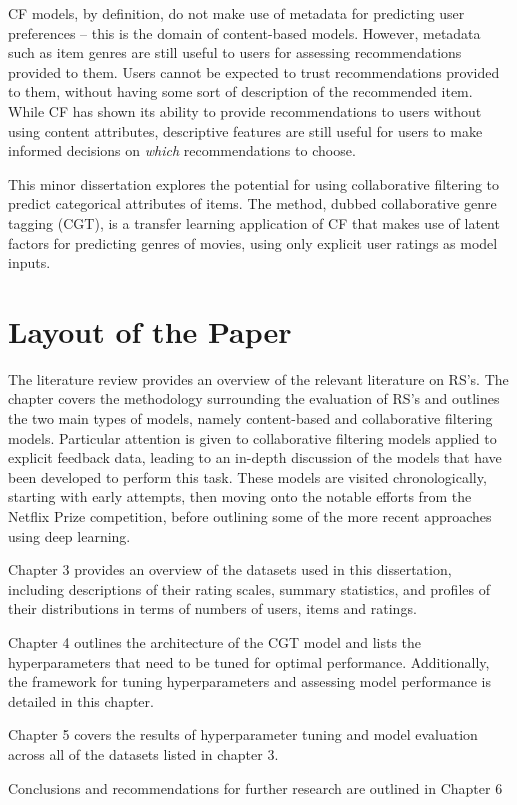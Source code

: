CF models, by definition, do not make use of metadata for predicting user preferences -- this is the domain of content-based models. However, metadata such as item genres are still useful to users for assessing recommendations provided to them. Users cannot be expected to trust recommendations provided to them, without having some sort of description of the recommended item. While CF has shown its ability to provide recommendations to users without using content attributes, descriptive features are still useful for users to make informed decisions on \textit{which} recommendations to choose.

This minor dissertation explores the potential for using collaborative filtering to predict categorical attributes of items. The method, dubbed collaborative genre tagging (CGT), is a transfer learning application of CF that makes use of latent factors for predicting genres of movies, using only explicit user ratings as model inputs.

\section{Layout of the Paper}
The literature review provides an overview of the relevant literature on RS's. The chapter covers the methodology surrounding the evaluation of RS's and outlines the two main types of models, namely content-based and collaborative filtering models. Particular attention is given to collaborative filtering models applied to explicit feedback data, leading to an in-depth discussion of the models that have been developed to perform this task. These models are visited chronologically, starting with early attempts, then moving onto the notable efforts from the Netflix Prize competition, before outlining some of the more recent approaches using deep learning.

Chapter 3 provides an overview of the datasets used in this dissertation, including descriptions of their rating scales, summary statistics, and profiles of their distributions in terms of numbers of users, items and ratings.

Chapter 4 outlines the architecture of the CGT model and lists the hyperparameters that need to be tuned for optimal performance. Additionally, the framework for tuning hyperparameters and assessing model performance is detailed in this chapter.

Chapter 5 covers the results of hyperparameter tuning and model evaluation across all of the datasets listed in chapter 3.

Conclusions and recommendations for further research are outlined in Chapter 6


 